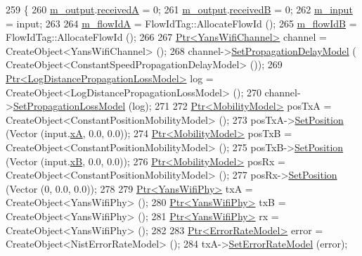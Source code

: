 \begin{DoxyCode}
259 \{
260   \hyperlink{classCollisionExperiment_a5a7408505c713d02596f1657848e7666}{m\_output}.\hyperlink{structCollisionExperiment_1_1Output_abdbc46d25da786a5bd465bbbae9fb811}{receivedA} = 0;
261   \hyperlink{classCollisionExperiment_a5a7408505c713d02596f1657848e7666}{m\_output}.\hyperlink{structCollisionExperiment_1_1Output_aecf9ff6b62ec5f8511a82052ed182353}{receivedB} = 0;
262   \hyperlink{classCollisionExperiment_a735b0105c62702501ae9e4b473795682}{m\_input} = input;
263 
264   \hyperlink{classCollisionExperiment_aea147790587130f8326370d34589b336}{m\_flowIdA} = FlowIdTag::AllocateFlowId ();
265   \hyperlink{classCollisionExperiment_a39fe5cdf6536df540d308abba68c2c0a}{m\_flowIdB} = FlowIdTag::AllocateFlowId ();
266 
267   \hyperlink{classns3_1_1Ptr}{Ptr<YansWifiChannel>} channel = CreateObject<YansWifiChannel> ();
268   channel->\hyperlink{classns3_1_1YansWifiChannel_a51ebdd5a1d897dc46cf9783ac2879b98}{SetPropagationDelayModel} (
      CreateObject<ConstantSpeedPropagationDelayModel> ());
269   \hyperlink{classns3_1_1Ptr}{Ptr<LogDistancePropagationLossModel>} log = 
      CreateObject<LogDistancePropagationLossModel> ();
270   channel->\hyperlink{classns3_1_1YansWifiChannel_ad2f92be1fb34be0075141cbb4f779191}{SetPropagationLossModel} (log);
271 
272   \hyperlink{classns3_1_1Ptr}{Ptr<MobilityModel>} posTxA = CreateObject<ConstantPositionMobilityModel> ();
273   posTxA->\hyperlink{classns3_1_1MobilityModel_ac584b3d5a309709d2f13ed6ada1e7640}{SetPosition} (Vector (input.\hyperlink{structCollisionExperiment_1_1Input_a62fb772dc1b9dd7564ec0436afaf77f1}{xA}, 0.0, 0.0));
274   \hyperlink{classns3_1_1Ptr}{Ptr<MobilityModel>} posTxB = CreateObject<ConstantPositionMobilityModel> ();
275   posTxB->\hyperlink{classns3_1_1MobilityModel_ac584b3d5a309709d2f13ed6ada1e7640}{SetPosition} (Vector (input.\hyperlink{structCollisionExperiment_1_1Input_a077d4ed496d30c5c298c570566ea592a}{xB}, 0.0, 0.0));
276   \hyperlink{classns3_1_1Ptr}{Ptr<MobilityModel>} posRx = CreateObject<ConstantPositionMobilityModel> ();
277   posRx->\hyperlink{classns3_1_1MobilityModel_ac584b3d5a309709d2f13ed6ada1e7640}{SetPosition} (Vector (0, 0.0, 0.0));
278 
279   \hyperlink{classns3_1_1Ptr}{Ptr<YansWifiPhy>} txA = CreateObject<YansWifiPhy> ();
280   \hyperlink{classns3_1_1Ptr}{Ptr<YansWifiPhy>} txB = CreateObject<YansWifiPhy> ();
281   \hyperlink{classns3_1_1Ptr}{Ptr<YansWifiPhy>} rx = CreateObject<YansWifiPhy> ();
282 
283   \hyperlink{classns3_1_1Ptr}{Ptr<ErrorRateModel>} error = CreateObject<NistErrorRateModel> ();
284   txA->\hyperlink{classns3_1_1WifiPhy_ac363f667899a813bb1331225bc1c1474}{SetErrorRateModel} (error);

\end{DoxyCode}
